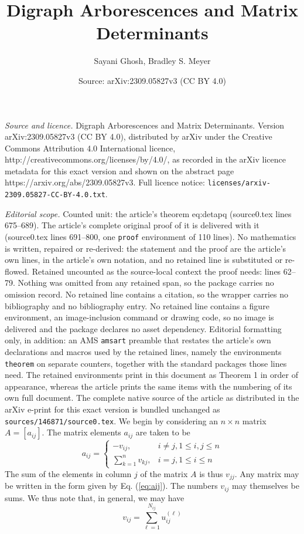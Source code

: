\documentclass[10pt,a4paper]{amsart}
\title{Digraph Arborescences and Matrix Determinants}
\author{Sayani Ghosh, Bradley S. Meyer}
\date{Source: arXiv:2309.05827v3 (CC BY 4.0)}
\begin{document}
\maketitle

\noindent\emph{Source and licence.} Digraph Arborescences and Matrix Determinants. Version arXiv:2309.05827v3 (CC BY 4.0), distributed by arXiv under the Creative Commons Attribution 4.0 International licence, http://creativecommons.org/licenses/by/4.0/, as recorded in the arXiv licence metadata for this exact version and shown on the abstract page https://arxiv.org/abs/2309.05827v3. Full licence notice: \texttt{licenses/arxiv-2309.05827-CC-BY-4.0.txt}.\par\smallskip

\noindent\textit{Editorial scope.} Counted unit: the article's theorem eq:detapq (source0.tex lines 675--689). The article's complete original proof of it is delivered with it (source0.tex lines 691--800, one \texttt{proof} environment of 110 lines). No mathematics is written, repaired or re-derived: the statement and the proof are the article's own lines, in the article's own notation, and no retained line is substituted or re-flowed.  Retained uncounted as the source-local context the proof needs: lines 62--79.  Nothing was omitted from any retained span, so the package carries no omission record.  No retained line contains a citation, so the wrapper carries no bibliography and no bibliography entry.  No retained line contains a figure environment, an image-inclusion command or drawing code, so no image is delivered and the package declares no asset dependency.  Editorial formatting only, in addition: an AMS \texttt{amsart} preamble that restates the article's own declarations and macros used by the retained lines, namely the environments \texttt{theorem} on separate counters, together with the standard packages those lines need.  The retained environments print in this document as Theorem 1 in order of appearance, whereas the article prints the same items with the numbering of its own full document.  The complete native source of the article as distributed in the arXiv e-print for this exact version is bundled unchanged as \texttt{sources/146871/source0.tex}.
We begin by considering an $n \times n$ matrix $A = \left[a_{ij}\right]$.
The matrix elements $a_{ij}$ are taken to be
\begin{equation}
a_{ij} = 
\begin{cases}
-v_{ij}, & i\ne j, 1 \leq i, j \leq n\\
 \sum_{k = 1}^n v_{kj}, & i = j, 1 \leq i \leq n
\end{cases}
\label{eq:aij}
\end{equation}
The sum of the elements in column $j$ of the matrix $A$ is thus $v_{jj}$.
Any matrix may be written in the form given by Eq. (\ref{eq:aij}).  The
numbers $v_{ij}$ may themselves be sums.  We thus note that, in general, we
may have
\begin{equation}
v_{ij} = \sum_{\ell=1}^{N_{ij}}  u_{ij}^{(\ell)}
\label{eq:uij}
\end{equation}
\end{document}
